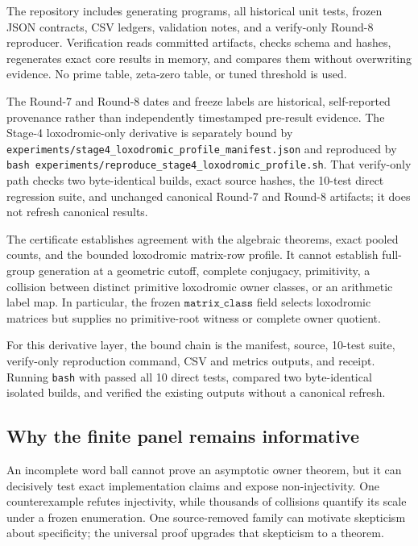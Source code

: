 \documentclass[11pt,a4paper]{article}
\theoremstyle{definition}
\theoremstyle{remark}
\begin{document}
The repository includes generating programs, all historical unit tests, frozen JSON contracts, CSV ledgers, validation notes, and a verify-only Round-8 reproducer. Verification reads committed artifacts, checks schema and hashes, regenerates exact core results in memory, and compares them without overwriting evidence. No prime table, zeta-zero table, or tuned threshold is used.

The Round-7 and Round-8 dates and freeze labels are historical, self-reported provenance rather than independently timestamped pre-result evidence. The Stage-4 loxodromic-only derivative is separately bound by \texttt{experiments/stage4\_loxodromic\_profile\_manifest.json} and reproduced by \texttt{bash experiments/reproduce\_stage4\_loxodromic\_profile.sh}. That verify-only path checks two byte-identical builds, exact source hashes, the 10-test direct regression suite, and unchanged canonical Round-7 and Round-8 artifacts; it does not refresh canonical results.

The certificate establishes agreement with the algebraic theorems, exact pooled counts, and the bounded loxodromic matrix-row profile. It cannot establish full-group generation at a geometric cutoff, complete conjugacy, primitivity, a collision between distinct primitive loxodromic owner classes, or an arithmetic label map. In particular, the frozen \(\texttt{matrix\_class}\) field selects loxodromic matrices but supplies no primitive-root witness or complete owner quotient.

For this derivative layer, the bound chain is the manifest, source, 10-test suite, verify-only reproduction command, CSV and metrics outputs, and receipt. Running \texttt{bash} with  passed all 10 direct tests, compared two byte-identical isolated builds, and verified the existing outputs without a canonical refresh.

\subsection{Why the finite panel remains informative}

An incomplete word ball cannot prove an asymptotic owner theorem, but it can decisively test exact implementation claims and expose non-injectivity. One counterexample refutes injectivity, while thousands of collisions quantify its scale under a frozen enumeration. One source-removed family can motivate skepticism about specificity; the universal proof upgrades that skepticism to a theorem.
\end{document}
